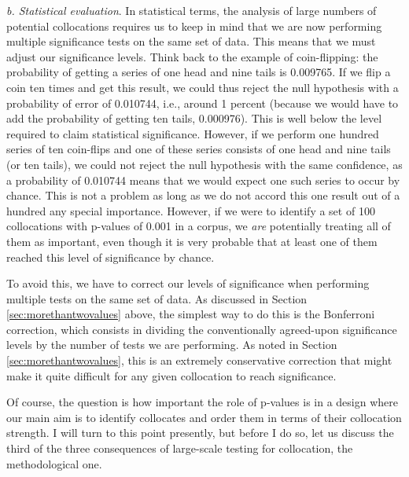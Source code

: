 \textit{b. Statistical evaluation}. In statistical terms, the analysis of large numbers of potential collocations requires us to keep in mind that we are now performing multiple significance tests on the same set of data. This means that we must adjust our significance levels. Think back to the example of coin-flipping: the probability of getting a series of one head and nine tails is 0.009765. If we flip a coin ten times and get this result, we could thus reject the null hypothesis with a probability of error of 0.010744, i.e., around 1 percent (because we would have to add the probability of getting ten tails, 0.000976). This is well below the level required to claim statistical significance. However, if we perform one hundred series of ten coin-flips and one of these series consists of one head and nine tails (or ten tails), we could not reject the null hypothesis with the same confidence, as a probability of 0.010744 means that we would expect one such series to occur by chance. This is not a problem as long as we do not accord this one result out of a hundred any special importance. However, if we were to identify a set of 100 collocations with p-values of 0.001 in a corpus, we \textit{are} potentially treating all of them as important, even though it is very probable that at least one of them reached this level of significance by chance. 

To avoid this, we have to correct our levels of significance when performing multiple tests on the same set of data. As discussed in Section \ref{sec:morethantwovalues} above, the simplest way to do this is the Bonferroni correction, which consists in dividing the conventionally agreed-upon significance levels by the number of tests we are performing. As noted in Section \ref{sec:morethantwovalues}, this is an extremely conservative correction that might make it quite difficult for any given collocation to reach significance. 


Of course, the question is how important the role of p-values is in a design where our main aim is to identify collocates and order them in terms of their collocation strength. I will turn to this point presently, but before I do so, let us discuss the third of the three consequences of large-scale testing for collocation, the methodological one.

